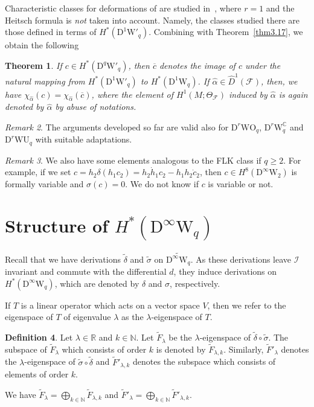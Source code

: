 \documentclass[12pt]{amsart}
\newcommand{\CF}{{\mathcal F}}
\newcommand{\C}{{\mathbb C}}
\newcommand{\R}{{\mathbb R}}
\newcommand{\Z}{{\mathbb Z}}
\newcommand{\N}{{\mathbb N}}
\newcommand{\WU}{\mathrm{WU}}
\newcommand{\WO}{\mathrm{WO}}
\newcommand{\W}{\mathrm{W}}
\newcommand{\D}{\mathrm{D}}
\newtheorem{theorem}{Theorem}[section]
\theoremstyle{definition}
\newtheorem{definition}[theorem]{Definition}
\theoremstyle{remark}
\newtheorem{remark}[theorem]{Remark}
\begin{document}
Characteristic classes for deformations of are studied in~\cite{asuke:UT}, where $r=1$ and the Heitsch formula is \textit{not} taken into account.
Namely, the classes studied there are those defined in terms of $H^*(\D^1\W'_q)$.
Combining with Theorem~\ref{thm3.17}, we obtain the following

\begin{theorem}
If $c\in H^*(\D^q\W'_q)$, then $\overline{c}$ denotes the image of $c$ under the natural mapping from $H^*(\D^1\W'_q)$ to $H^*(\D^1\W_q)$.
If $\widehat\alpha\in\widehat{D}^1(\mathcal{F})$, then, we have $\chi_{\widehat\alpha}(c)=\chi_{\widehat\alpha}(\overline{c})$, where the element of $H^1(M;\Theta_\CF)$ induced by $\widehat\alpha$ is again denoted by $\widehat\alpha$ by abuse of notations.
\end{theorem}

\begin{remark}
The arguments developed so far are valid also for $\D^r\WO_q$, $\D^r\W^\C_q$ and $\D^r\WU_q$ with suitable adaptations.
\end{remark}

\begin{remark}
We also have some elements analogous to the FLK class if $q\geq2$.
For example, if we set $c=h_2\delta(h_1c_2)=h_2\dot{h}_1c_2-h_1h_2\dot{c}_2$, then $c\in H^8(\D^\infty\W_2)$ is formally variable and $\sigma(c)=0$.
We do not know if $c$ is variable or not.
\end{remark}

\section{Structure of $H^*(\D^\infty\W_q)$}

Recall that we have derivations $\widetilde\delta$ and $\widetilde\sigma$ on $\widetilde{\D^\infty\W_q}$.
As these derivations leave $\mathscr{I}$ invariant and commute with the differential $d$, they induce derivations on $H^*(\D^\infty\W_q)$, which are denoted by $\delta$ and $\sigma$, respectively.


If $T$ is a linear operator which acts on a vector space $V$, then we refer to the eigenspace of $T$ of eigenvalue $\lambda$ as the $\lambda$-eigenspace of $T$.
\begin{definition}
Let $\lambda\in\R$ and $k\in\N$.
Let $\widetilde{F}_\lambda$ be the $\lambda$-eigenspace of $\widetilde\delta\circ\widetilde\sigma$.
The subspace of $\widetilde{F}_\lambda$ which consists of order $k$ is denoted by $\widetilde{F}_{\lambda,k}$.
Similarly, $\widetilde{F}'_\lambda$ denotes the $\lambda$-eigenspace of $\widetilde\sigma\circ\widetilde\delta$ and $\widetilde{F}'_{\lambda,k}$ denotes the subspace which consists of elements of order $k$.
\end{definition}
We have $\widetilde{F}_\lambda=\bigoplus_{k\in\N}\widetilde{F}_{\lambda,k}$ and $\widetilde{F}'_\lambda=\bigoplus_{k\in\N}\widetilde{F}'_{\lambda,k}$.
\end{document}
